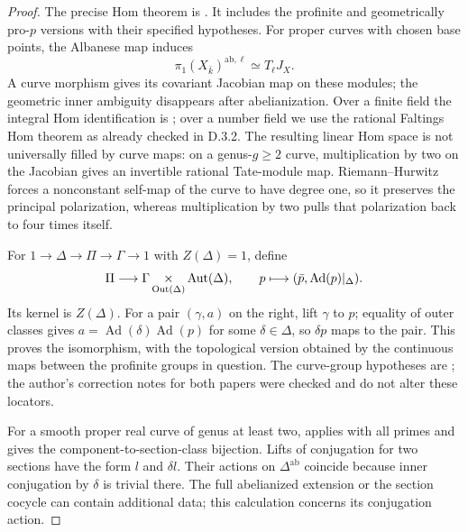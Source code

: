 \begin{proof}
The precise Hom theorem is \cite[Theorem A, PDF p.3, equivalently Theorem 16.5 and its following remark]{AuditMochizuki1999}. It includes the profinite and geometrically pro-$p$ versions with their specified hypotheses. For proper curves with chosen base points, the Albanese map induces
\[
 \pi_1(X_{\bar k})^{\mathrm{ab},\ell}\simeq T_\ell J_X.
\]
A curve morphism gives its covariant Jacobian map on these modules; the geometric inner ambiguity disappears after abelianization. Over a finite field the integral Hom identification is \cite[Main Theorem, p.134]{AuditTate1966}; over a number field we use the rational Faltings Hom theorem as already checked in D.3.2. The resulting linear Hom space is not universally filled by curve maps: on a genus-$g\geq2$ curve, multiplication by two on the Jacobian gives an invertible rational Tate-module map. Riemann--Hurwitz forces a nonconstant self-map of the curve to have degree one, so it preserves the principal polarization, whereas multiplication by two pulls that polarization back to four times itself.

For $1\to\Delta\to\Pi\to\Gamma\to1$ with $Z(\Delta)=1$, define
\[
 \Pi\longrightarrow
 \Gamma\mathop{\times}_{\operatorname{Out}(\Delta)}\operatorname{Aut}(\Delta),
 \qquad p\longmapsto(\bar p,\operatorname{Ad}(p)|_\Delta).
\]
Its kernel is $Z(\Delta)$. For a pair $(\gamma,a)$ on the right, lift $\gamma$ to $p$; equality of outer classes gives $a=\operatorname{Ad}(\delta)\operatorname{Ad}(p)$ for some $\delta\in\Delta$, so $\delta p$ maps to the pair. This proves the isomorphism, with the topological version obtained by the continuous maps between the profinite groups in question. The curve-group hypotheses are \cite[Lemma 1.3.1 and Corollary 1.3.2]{AuditMochizuki2004}; the author's correction notes for both papers were checked and do not alter these locators.

For a smooth proper real curve of genus at least two, \cite[Theorem 1.3 and Example 5.8]{AuditPal2011} applies with all primes and gives the component-to-section-class bijection. Lifts of conjugation for two sections have the form $l$ and $\delta l$. Their actions on $\Delta^{\mathrm{ab}}$ coincide because inner conjugation by $\delta$ is trivial there. The full abelianized extension or the section cocycle can contain additional data; this calculation concerns its conjugation action.


\end{proof}
